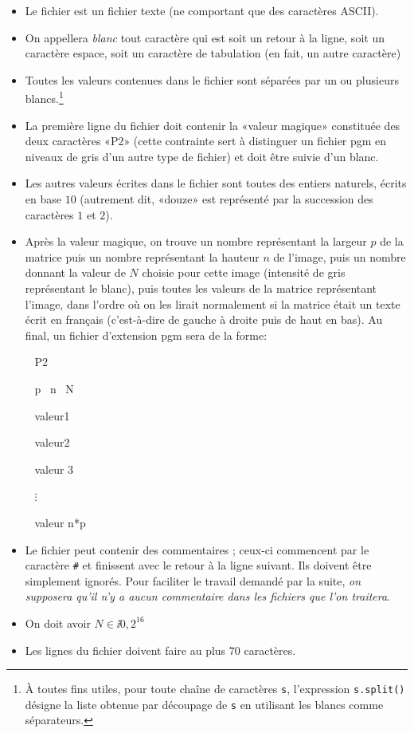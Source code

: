 \begin{itemize}
	\item[\textbullet] Le fichier est un fichier texte (ne comportant que des
	caractères ASCII).
	\item[\textbullet] On appellera \emph{blanc} tout caractère qui est soit un retour à la
	ligne, soit un caractère espace, soit un caractère de tabulation (en
	fait, un autre caractère)
	\item[\textbullet] Toutes les valeurs contenues dans le fichier sont séparées par
	un ou plusieurs blancs.\footnote{À toutes fins utiles, pour toute
		chaîne de caractères \texttt{s}, l'expression \texttt{s.split()} désigne
		la liste obtenue par découpage de \texttt{s} en utilisant les blancs
		comme séparateurs.}
	\item[\textbullet] La première ligne du fichier doit contenir la «valeur magique»
	constituée des deux caractères «P2» (cette contrainte sert à
	distinguer un fichier pgm en niveaux de gris d'un autre type de fichier) et doit être
	suivie d'un blanc.
	\item[\textbullet] Les autres valeurs écrites dans le fichier sont toutes des
	entiers naturels, écrits en base $10$ (autrement
	dit, «douze» est représenté par la succession des caractères $1$ et $2$).
	\item[\textbullet] Après  la valeur  magique, on trouve  un nombre  représentant la
	largeur $p$ de la matrice puis un nombre représentant la hauteur $n$
	de l'image,  puis un  nombre donnant la  valeur de $N$  choisie pour
	cette image  (intensité de gris représentant le  blanc), puis toutes
	les valeurs de  la matrice représentant l'image, dans  l'ordre où on
	les  lirait  normalement si  la  matrice  était  un texte  écrit  en
	français (c'est-à-dire de gauche à droite puis de haut en bas).
	Au final, un fichier d'extension pgm sera de la forme:
			
			\ \hskip5cm P2	
			
			\ \hskip5cm p \ n \ N 	
			
			\ \hskip5cm valeur1 
			
			\ \hskip5cm valeur2
			
			\ \hskip5cm valeur 3
			
			\ \hskip5.5cm $\vdots$
			
			\ \hskip5cm valeur n*p
	
\medskip 	
	\item[\textbullet] Le fichier peut contenir des commentaires ; ceux-ci commencent par le
	caractère \texttt{\#} et finissent avec le retour à la ligne
	suivant. Ils doivent être simplement ignorés. Pour faciliter le
	travail demandé par la suite, \emph{on supposera qu'il n'y a aucun
		commentaire dans les fichiers que l'on
		traitera}.
	\item[\textbullet] On doit avoir $N\in\ii{0, 2^{16}}$
	\item[\textbullet] Les lignes du fichier doivent faire au plus $70$ caractères.
\end{itemize}



